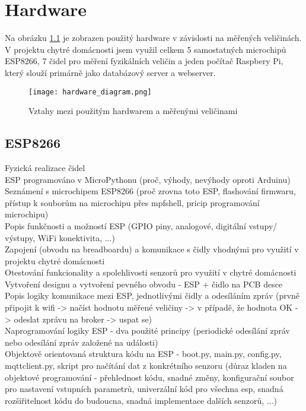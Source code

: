 \chapter{Hardware} \label{chap:methods}
Na obrázku \cref{fig:hardware_diagram} je zobrazen použitý hardware v závislosti na měřených veličinách. V projektu chytré domácnosti jsem využil celkem 5 samostatných microchipů ESP8266, 7 čidel pro měření fyzikálních veličin a jeden počítač Raspbery Pi, který slouží primárně jako databázový server a webserver.

\begin{figure}[H]
  \centering
  \texttt{[image: hardware\_diagram.png]}
  \caption{Vztahy mezi použitým hardwarem a měřenými veličinami}
  \label{fig:hardware_diagram}
\end{figure}



\section{ESP8266} \label{sec:example_xor}

Fyzická realizace čidel \\
ESP programováno v MicroPythonu (proč, výhody, nevýhody oproti Arduinu) \\
Seznámení s microchipem ESP8266 (proč zrovna toto ESP, flashování firmwaru, přístup k souborům na microchipu přes mpfshell, pricip programování microchipu) \\
Popis funkčnosti a možností ESP (GPIO piny, analogové, digitální vstupy/ výstupy, WiFi konektivita, ...) \\
Zapojení (obvodu na breadboardu) a komunikace s čidly vhodnými pro využití v projektu chytré domácnosti \\
Otestování funkcionality a spolehlivosti senzorů pro využití v chytré domácnosti  \\
Vytvoření designu a vytvoření pevného obvodu - ESP + čidlo na PCB desce \\
Popis logiky komunikace mezi ESP, jednotlivými čidly a odesíláním zpráv (prvně připojit k wifi -> načíst hodnotu měřené veličiny -> v případě, že hodnota OK -> odeslat zprávu na broker -> uspat se) \\
Naprogramování logiky ESP - dva použité principy (periodické odesílání zpráv nebo odesílání zpráv založené na události) \\
Objektově orientovaná struktura kódu na ESP - boot.py, main.py, config.py, mqttclient.py, skript pro načítání dat z konkrétního senzoru (důraz kladen na objektové programování - přehlednost kódu, snadné změny, konfigurační soubor pro nastavení vstupních parametrů, univerzální kód pro všechna esp, snadná rozšiřitelnost kódu do budoucna, snadná implementace dalších senzorů, ...) \\

